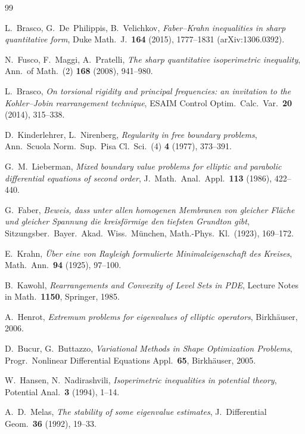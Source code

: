 \documentclass[11pt]{article}
\theoremstyle{definition}
\begin{document}
\begin{thebibliography}{99}

 L.~Brasco, G.~De~Philippis, B.~Velichkov,
\emph{Faber--Krahn inequalities in sharp quantitative form},
Duke Math.\ J.\ \textbf{164} (2015), 1777--1831 (arXiv:1306.0392).

 N.~Fusco, F.~Maggi, A.~Pratelli,
\emph{The sharp quantitative isoperimetric inequality},
Ann.\ of Math.\ (2) \textbf{168} (2008), 941--980.

 L.~Brasco,
\emph{On torsional rigidity and principal frequencies: an invitation
to the Kohler--Jobin rearrangement technique},
ESAIM Control Optim.\ Calc.\ Var.\ \textbf{20} (2014), 315--338.

 D.~Kinderlehrer, L.~Nirenberg,
\emph{Regularity in free boundary problems},
Ann.\ Scuola Norm.\ Sup.\ Pisa Cl.\ Sci.\ (4) \textbf{4} (1977), 373--391.

 G.~M.~Lieberman,
\emph{Mixed boundary value problems for elliptic and parabolic
differential equations of second order},
J.~Math.\ Anal.\ Appl.\ \textbf{113} (1986), 422--440.

 G.~Faber,
\emph{Beweis, dass unter allen homogenen Membranen von gleicher
Fl\"ache und gleicher Spannung die kreisf\"ormige den tiefsten
Grundton gibt},
Sitzungsber.\ Bayer.\ Akad.\ Wiss.\ M\"unchen,
Math.-Phys.\ Kl.\ (1923), 169--172.

 E.~Krahn,
\emph{\"Uber eine von Rayleigh formulierte Minimaleigenschaft des
Kreises}, Math.\ Ann.\ \textbf{94} (1925), 97--100.

 B.~Kawohl,
\emph{Rearrangements and Convexity of Level Sets in PDE},
Lecture Notes in Math.\ \textbf{1150}, Springer, 1985.

 A.~Henrot,
\emph{Extremum problems for eigenvalues of elliptic operators},
Birkh\"auser, 2006.

 D.~Bucur, G.~Buttazzo,
\emph{Variational Methods in Shape Optimization Problems},
Progr.\ Nonlinear Differential Equations Appl.\ \textbf{65},
Birkh\"auser, 2005.

 W.~Hansen, N.~Nadirashvili,
\emph{Isoperimetric inequalities in potential theory},
Potential Anal.\ \textbf{3} (1994), 1--14.

 A.~D.~Melas,
\emph{The stability of some eigenvalue estimates},
J.\ Differential Geom.\ \textbf{36} (1992), 19--33.


\end{thebibliography}
\end{document}
